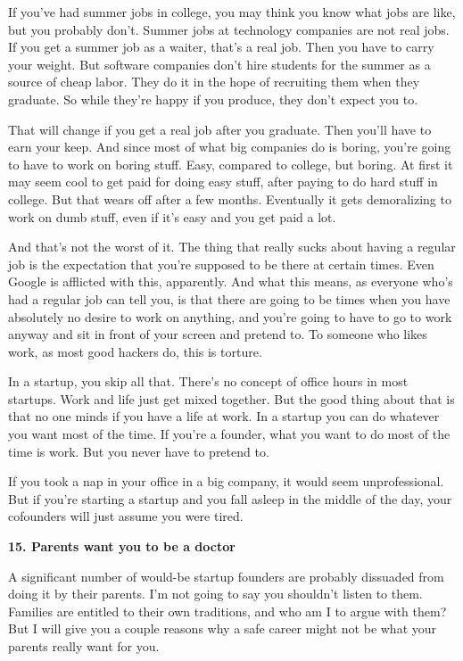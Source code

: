 If you've had summer jobs in college, you may think you know what jobs
are like, but you probably don't. Summer jobs at technology companies
are not real jobs. If you get a summer job as a waiter, that's a real
job. Then you have to carry your weight. But software companies don't
hire students for the summer as a source of cheap labor. They do it in
the hope of recruiting them when they graduate. So while they're happy
if you produce, they don't expect you to.

That will change if you get a real job after you graduate. Then you'll
have to earn your keep. And since most of what big companies do is
boring, you're going to have to work on boring stuff. Easy, compared to
college, but boring. At first it may seem cool to get paid for doing
easy stuff, after paying to do hard stuff in college. But that wears off
after a few months. Eventually it gets demoralizing to work on dumb
stuff, even if it's easy and you get paid a lot.

And that's not the worst of it. The thing that really sucks about having
a regular job is the expectation that you're supposed to be there at
certain times. Even Google is afflicted with this, apparently. And what
this means, as everyone who's had a regular job can tell you, is that
there are going to be times when you have absolutely no desire to work
on anything, and you're going to have to go to work anyway and sit in
front of your screen and pretend to. To someone who likes work, as most
good hackers do, this is torture.

In a startup, you skip all that. There's no concept of office hours in
most startups. Work and life just get mixed together. But the good thing
about that is that no one minds if you have a life at work. In a startup
you can do whatever you want most of the time. If you're a founder, what
you want to do most of the time is work. But you never have to pretend
to.

If you took a nap in your office in a big company, it would seem
unprofessional. But if you're starting a startup and you fall asleep in
the middle of the day, your cofounders will just assume you were tired.

\textbf{15. Parents want you to be a doctor}

A significant number of would-be startup founders are probably dissuaded
from doing it by their parents. I'm not going to say you shouldn't
listen to them. Families are entitled to their own traditions, and who
am I to argue with them? But I will give you a couple reasons why a safe
career might not be what your parents really want for you.


